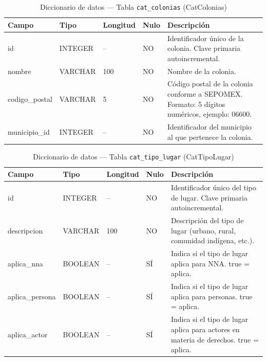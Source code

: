 \begin{table}[H]
	\centering
	\caption{Diccionario de datos --- Tabla \texttt{cat\_colonias} (CatColonias)}
	\label{tab:data-dict-cat_colonias}
	\scriptsize
	\begin{tabular}{>{\ttfamily\raggedright\arraybackslash}p{3.6cm} p{1.6cm} p{1.3cm} p{0.7cm} p{5.6cm}}
		\toprule
		\textbf{Campo} & \textbf{Tipo} & \textbf{Longitud} & \textbf{Nulo} & \textbf{Descripción} \\
		\midrule
		id & INTEGER & -- & NO & Identificador único de la colonia. Clave primaria autoincremental. \\
		nombre & VARCHAR & 100 & NO & Nombre de la colonia. \\
		codigo\_postal & VARCHAR & 5 & NO & Código postal de la colonia conforme a SEPOMEX. Formato: 5 dígitos numéricos, ejemplo: 06600. \\
		municipio\_id & INTEGER & -- & NO & Identificador del municipio al que pertenece la colonia. \\
		\bottomrule
	\end{tabular}
\end{table}

\begin{table}[H]
	\centering
	\caption{Diccionario de datos --- Tabla \texttt{cat\_tipo\_lugar} (CatTipoLugar)}
	\label{tab:data-dict-cat_tipo_lugar}
	\scriptsize
	\begin{tabular}{>{\ttfamily\raggedright\arraybackslash}p{3.6cm} p{1.6cm} p{1.3cm} p{0.7cm} p{5.6cm}}
		\toprule
		\textbf{Campo} & \textbf{Tipo} & \textbf{Longitud} & \textbf{Nulo} & \textbf{Descripción} \\
		\midrule
		id & INTEGER & -- & NO & Identificador único del tipo de lugar. Clave primaria autoincremental. \\
		descripcion & VARCHAR & 100 & NO & Descripción del tipo de lugar (urbano, rural, comunidad indígena, etc.). \\
		aplica\_nna & BOOLEAN & -- & SÍ & Indica si el tipo de lugar aplica para NNA. true = aplica. \\
		aplica\_persona & BOOLEAN & -- & SÍ & Indica si el tipo de lugar aplica para personas. true = aplica. \\
		aplica\_actor & BOOLEAN & -- & SÍ & Indica si el tipo de lugar aplica para actores en materia de derechos. true = aplica. \\
		\bottomrule
	\end{tabular}
\end{table}

